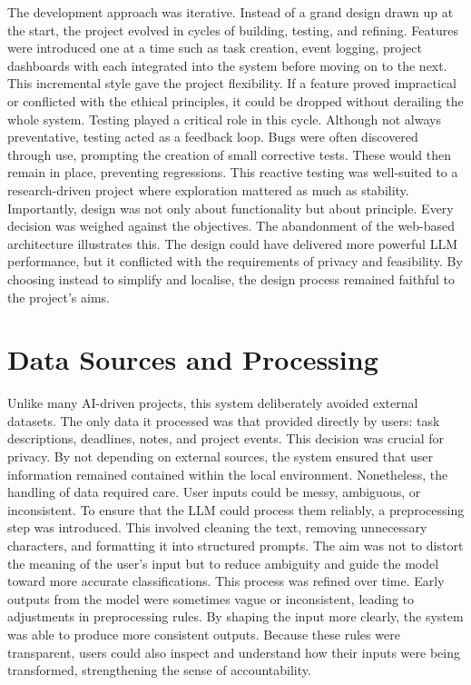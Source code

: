 \documentclass{report}
\begin{document}
The development approach was iterative. Instead of a grand design drawn up at the start, the project evolved in cycles of building, testing, and refining. Features were introduced one at a time such as task creation, event logging, project dashboards with each integrated into the system before moving on to the next. This incremental style gave the project flexibility. If a feature proved impractical or conflicted with the ethical principles, it could be dropped without derailing the whole system.
Testing played a critical role in this cycle. Although not always preventative, testing acted as a feedback loop. Bugs were often discovered through use, prompting the creation of small corrective tests. These would then remain in place, preventing regressions. This reactive testing was well-suited to a research-driven project where exploration mattered as much as stability.
Importantly, design was not only about functionality but about principle. Every decision was weighed against the objectives. The abandonment of the web-based architecture illustrates this. The design could have delivered more powerful LLM performance, but it conflicted with the requirements of privacy and feasibility. By choosing instead to simplify and localise, the design process remained faithful to the project's aims.

\section{Data Sources and Processing}

Unlike many AI-driven projects, this system deliberately avoided external datasets. The only data it processed was that provided directly by users: task descriptions, deadlines, notes, and project events. This decision was crucial for privacy. By not depending on external sources, the system ensured that user information remained contained within the local environment.
Nonetheless, the handling of data required care. User inputs could be messy, ambiguous, or inconsistent. To ensure that the LLM could process them reliably, a preprocessing step was introduced. This involved cleaning the text, removing unnecessary characters, and formatting it into structured prompts. The aim was not to distort the meaning of the user's input but to reduce ambiguity and guide the model toward more accurate classifications.
This process was refined over time. Early outputs from the model were sometimes vague or inconsistent, leading to adjustments in preprocessing rules. By shaping the input more clearly, the system was able to produce more consistent outputs. Because these rules were transparent, users could also inspect and understand how their inputs were being transformed, strengthening the sense of accountability.
\end{document}
